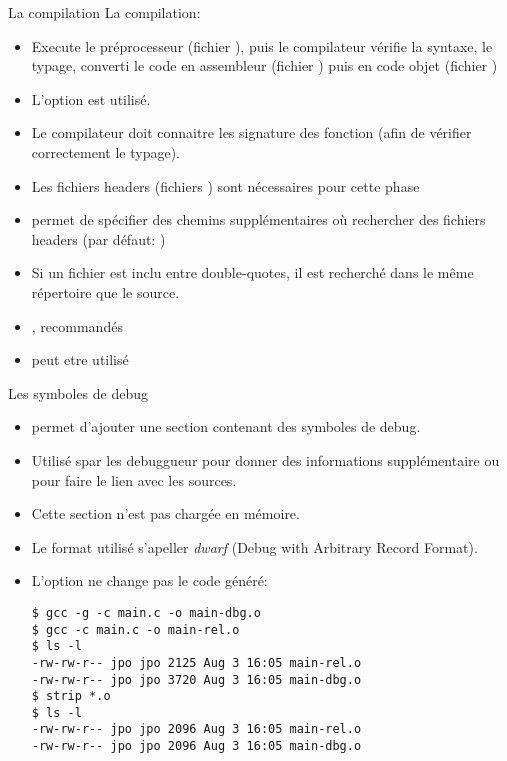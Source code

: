 \begin{frame}[fragile=singleslide]{La compilation}
  La compilation:
  \begin{itemize}
  \item Execute le préprocesseur (fichier ), puis le compilateur
    vérifie  la syntaxe,  le typage,  converti le  code  en assembleur
    (fichier ) puis en code objet (fichier )
  \item L'option  est utilisé.
  \item Le compilateur doit connaitre les signature des fonction (afin
    de vérifier correctement le typage).
  \item Les  fichiers headers  (fichiers ) sont  nécessaires pour
    cette phase
  \item  {} permet  de  spécifier des  chemins supplémentaires  où
    rechercher des fichiers headers (par défaut: )
  \item Si un fichier est  inclu entre double-quotes, il est recherché
    dans le même répertoire que le source.
  \item {},  recommandés
  \item {} peut etre utilisé
  \end{itemize}
\end{frame}

\begin{frame}[fragile=singleslide]{Les symboles de debug}
  \begin{itemize}
  \item {} permet d'ajouter  une section contenant des symboles de
    debug.
  \item  Utilisé  spar les  debuggueur  pour  donner des  informations
    supplémentaire ou pour faire le lien avec les sources.
  \item Cette section n'est pas chargée en mémoire.
  \item Le format utilisé s'apeller \emph{dwarf} (Debug with Arbitrary
    Record Format).
  \item L'option  ne change pas le code généré:
    \begin{lstlisting}
$ gcc -g -c main.c -o main-dbg.o
$ gcc -c main.c -o main-rel.o
$ ls -l
-rw-rw-r-- jpo jpo 2125 Aug 3 16:05 main-rel.o
-rw-rw-r-- jpo jpo 3720 Aug 3 16:05 main-dbg.o
$ strip *.o
$ ls -l
-rw-rw-r-- jpo jpo 2096 Aug 3 16:05 main-rel.o
-rw-rw-r-- jpo jpo 2096 Aug 3 16:05 main-dbg.o
    \end{lstlisting}
  \end{itemize}
\end{frame}

